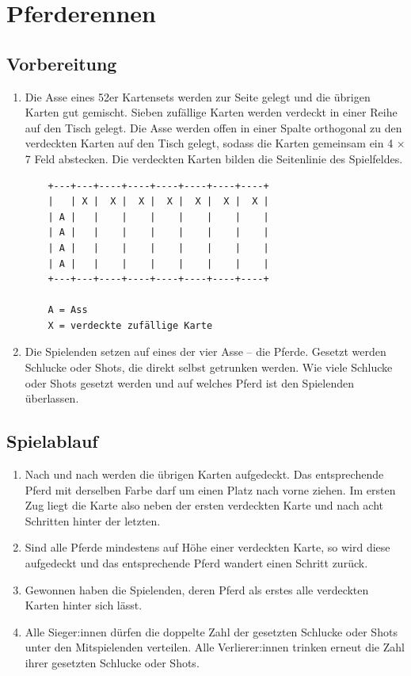 \chapter{Pferderennen}
\section{Vorbereitung}
\begin{enumerate}[label={(\arabic*)}]    
    \item
    Die Asse eines 52er Kartensets werden zur Seite gelegt und die übrigen Karten gut gemischt.
    Sieben zufällige Karten werden verdeckt in einer Reihe auf den Tisch gelegt.
    Die Asse werden offen in einer Spalte orthogonal zu den verdeckten Karten auf den Tisch gelegt, sodass die Karten gemeinsam ein 4 \begin{math}\times\end{math} 7 Feld abstecken.
    Die verdeckten Karten bilden die Seitenlinie des Spielfeldes.
    \begin{verbatim}
    +---+---+----+----+----+----+----+----+
    |   | X |  X |  X |  X |  X |  X |  X |
    | A |   |    |    |    |    |    |    |
    | A |   |    |    |    |    |    |    |
    | A |   |    |    |    |    |    |    |
    | A |   |    |    |    |    |    |    |
    +---+---+----+----+----+----+----+----+
    
    A = Ass
    X = verdeckte zufällige Karte
    \end{verbatim}

    \item
    Die Spielenden setzen auf eines der vier Asse – die \glqq{}Pferde\grqq{}.
    Gesetzt werden Schlucke oder Shots, die direkt selbst getrunken werden.
    Wie viele Schlucke oder Shots gesetzt werden und auf welches Pferd ist den Spielenden überlassen.
\end{enumerate}

\section{Spielablauf}
\begin{enumerate}[label={(\arabic*)}]
    \item
    Nach und nach werden die übrigen Karten aufgedeckt.
    Das entsprechende Pferd mit derselben Farbe darf um einen Platz nach vorne ziehen.
    Im ersten Zug liegt die Karte also neben der ersten verdeckten Karte und nach acht Schritten hinter der letzten.

    \item
    Sind alle Pferde mindestens auf Höhe einer verdeckten Karte, so wird diese aufgedeckt und das entsprechende Pferd wandert einen Schritt zurück.

    \item
    Gewonnen haben die Spielenden, deren Pferd als erstes alle verdeckten Karten hinter sich lässt.

    \item
    Alle Sieger:innen dürfen die doppelte Zahl der gesetzten Schlucke oder Shots unter den Mitspielenden verteilen.
    Alle Verlierer:innen trinken erneut die Zahl ihrer gesetzten Schlucke oder Shots.
\end{enumerate}
